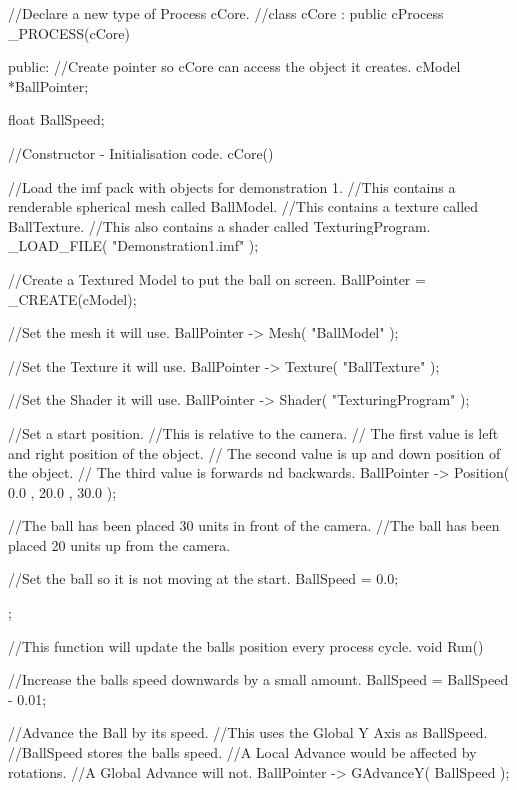 \begin{DoxyCode}
 //Declare a new type of Process cCore.
 //class cCore : public cProcess
 _PROCESS(cCore)
 {
 public:
 //Create pointer so cCore can  access the object it creates.
 cModel *BallPointer;

 float BallSpeed;

  //Constructor - Initialisation code.
        cCore()
        {
        //Load the imf pack with objects for demonstration 1.
        //This contains a renderable spherical mesh called BallModel.
        //This contains a texture called BallTexture.
        //This also contains a shader called TexturingProgram.
                 _LOAD_FILE( "Demonstration1.imf" );

        //Create a Textured Model to put the ball on screen.
                BallPointer =  _CREATE(cModel);

        //Set the mesh it will use.
                BallPointer -> Mesh( "BallModel" );

        //Set the Texture it will use.
                BallPointer -> Texture( "BallTexture" );

        //Set the Shader it will use.
                BallPointer -> Shader( "TexturingProgram" );

        //Set a start position.
        //This is relative to the camera.
        // The first value is left and right position of the object.
        // The second value is up and down position of the object.
        // The third value is forwards nd backwards.
                BallPointer -> Position( 0.0 , 20.0 , 30.0 );

        //The ball has been placed 30 units in front of the camera.
        //The ball has been placed 20 units up from the camera.

        //Set the ball so it is not moving at the start.
                BallSpeed = 0.0;
        };

        //This function will update the balls position every process cycle.
        void Run()
        {
                //Increase the balls speed downwards by a small amount.
                        BallSpeed = BallSpeed - 0.01;

                //Advance the Ball by its speed.
                //This uses the Global Y Axis as BallSpeed.
                //BallSpeed stores the balls speed.
                //A Local Advance would be affected by rotations.
                //A Global Advance will not.
                        BallPointer -> GAdvanceY( BallSpeed );

}}
\end{DoxyCode}
